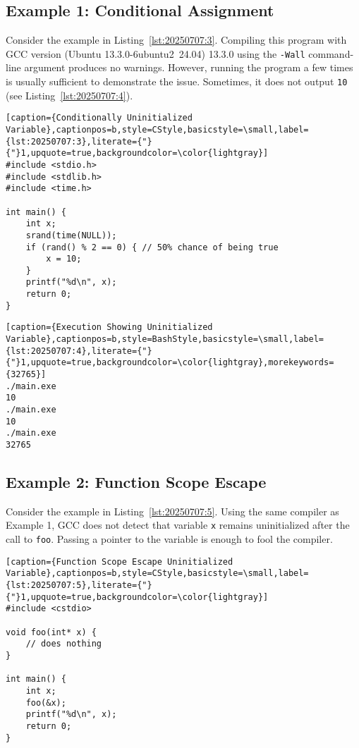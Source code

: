 \subsection*{Example 1: Conditional Assignment}

Consider the example in Listing~\ref{lst:20250707:3}. Compiling this program with GCC version (Ubuntu 13.3.0-6ubuntu2~24.04) 13.3.0 using the \texttt{-Wall} command-line argument produces no warnings. However, running the program a few times is usually sufficient to demonstrate the issue. Sometimes, it does not output \texttt{10} (see Listing~\ref{lst:20250707:4}).

\begin{lstlisting}[caption={Conditionally Uninitialized Variable},captionpos=b,style=CStyle,basicstyle=\small,label={lst:20250707:3},literate={"}{"}1,upquote=true,backgroundcolor=\color{lightgray}]
#include <stdio.h>
#include <stdlib.h>
#include <time.h>

int main() {
	int x;
	srand(time(NULL));
	if (rand() % 2 == 0) { // 50% chance of being true
		x = 10;
	}
	printf("%d\n", x);
	return 0;
}
\end{lstlisting}

\begin{lstlisting}[caption={Execution Showing Uninitialized Variable},captionpos=b,style=BashStyle,basicstyle=\small,label={lst:20250707:4},literate={"}{"}1,upquote=true,backgroundcolor=\color{lightgray},morekeywords={32765}]
./main.exe
10
./main.exe
10
./main.exe
32765
\end{lstlisting}

\subsection*{Example 2: Function Scope Escape}

Consider the example in Listing~\ref{lst:20250707:5}. Using the same compiler as Example 1, GCC does not detect that variable \texttt{x} remains uninitialized after the call to \texttt{foo}. Passing a pointer to the variable is enough to fool the compiler.

\begin{lstlisting}[caption={Function Scope Escape Uninitialized Variable},captionpos=b,style=CStyle,basicstyle=\small,label={lst:20250707:5},literate={"}{"}1,upquote=true,backgroundcolor=\color{lightgray}]
#include <cstdio>

void foo(int* x) {
	// does nothing
}

int main() {
	int x;
	foo(&x);
	printf("%d\n", x);
	return 0;
}
\end{lstlisting}

